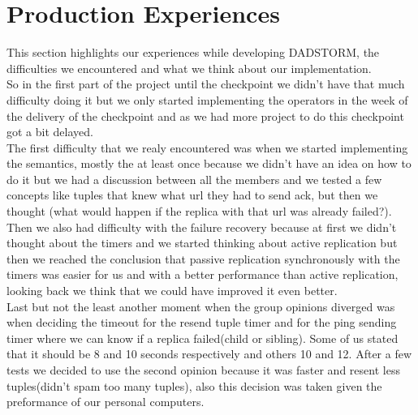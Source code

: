 \documentclass[times, 10pt, twocolumn]{article}
\begin{document}
\section{Production Experiences}
This section highlights our experiences while developing DADSTORM, the difficulties we encountered and what we think about our implementation.
\\So in the first part of the project until the checkpoint we didn't have that much difficulty doing it but we only started implementing the operators in the week of the delivery of the checkpoint and as we had more project to do this checkpoint got a bit delayed.
\\The first difficulty that we realy encountered was when we started implementing the semantics, mostly the at least once because we didn't have an idea on how to do it but we had a discussion between all the members and we tested a few concepts like tuples that knew what url they had to send ack, but then we thought (what would happen if the replica with that url was already failed?).
\\Then we also had difficulty with the failure recovery because at first we didn't thought about the timers and we started thinking about active replication but then we reached the conclusion that passive replication synchronously with the timers was easier for us and with a better performance than active replication, looking back we think that we could have improved it even better.
\\Last but not the least another moment when the group opinions diverged was when deciding the timeout for the resend tuple timer and for the ping sending timer where we can know if a replica failed(child or sibling). Some of us stated that it should be 8 and 10 seconds respectively and others 10 and 12. After a few tests we decided to use the second opinion because it was faster and resent less tuples(didn't spam too many tuples), also this decision was taken given the preformance of our personal computers.




\end{document}
